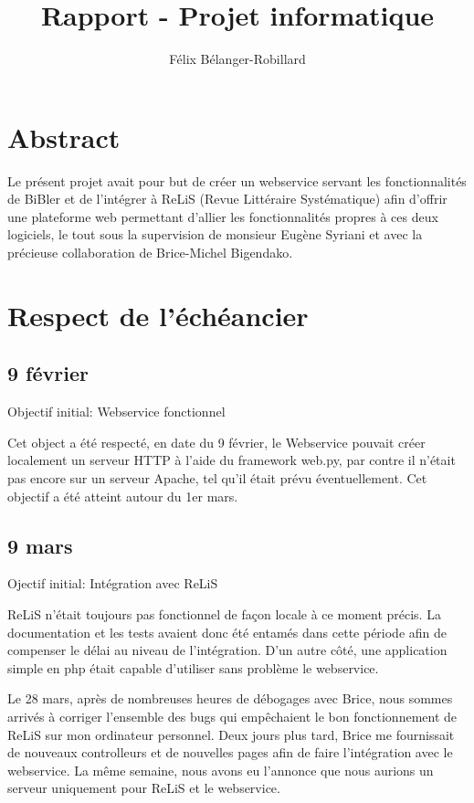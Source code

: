\documentclass[a4paper,12pt,titlepage]{article}
\author{Félix Bélanger-Robillard}
\title{Rapport - Projet informatique}
\begin{document}
\maketitle

\tableofcontents
\newpage

\section{Abstract}
Le présent projet avait pour but de créer un webservice servant les fonctionnalités de BiBler et de l'intégrer à ReLiS (Revue Littéraire Systématique) afin d'offrir une plateforme web permettant d'allier les fonctionnalités propres à ces deux logiciels, le tout sous la supervision de monsieur Eugène Syriani et avec la précieuse collaboration de Brice-Michel Bigendako.
\section{Respect de l'échéancier}
\subsection{9 février}
Objectif initial: Webservice fonctionnel \newline

Cet object a été respecté, en date du 9 février, le Webservice pouvait créer localement un serveur HTTP à l'aide du framework web.py, par contre il n'était pas encore sur un serveur Apache, tel qu'il était prévu éventuellement. Cet objectif a été atteint autour du 1er mars.
\subsection{9 mars}
Ojectif initial: Intégration avec ReLiS \newline

ReLiS n'était toujours pas fonctionnel de façon locale à ce moment précis. La documentation et les tests avaient donc été entamés dans cette période afin de compenser le délai au niveau de l'intégration. D'un autre côté, une application simple en php était capable d'utiliser sans problème le webservice. \newline

Le 28 mars, après de nombreuses heures de débogages avec Brice, nous sommes arrivés à corriger l'ensemble des bugs qui empêchaient le bon fonctionnement de ReLiS sur mon ordinateur personnel. Deux jours plus tard, Brice me fournissait de nouveaux controlleurs et de nouvelles pages afin de faire l'intégration avec le webservice. La même semaine, nous avons eu l'annonce que nous aurions un serveur uniquement pour ReLiS et le webservice. \newline
\end{document}
